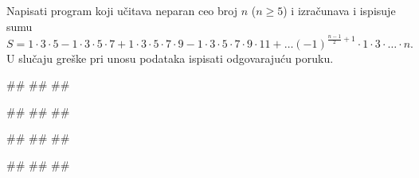 \begin{Exercise}[difficulty=1, label=PET_48] 
Napisati program koji učitava neparan ceo broj $n$ ($n\geq5$) i izračunava
i ispisuje sumu 
$$S = 1\cdot3\cdot5 - 1\cdot3\cdot5\cdot7 + 1\cdot3\cdot5\cdot7\cdot9
- 1\cdot3\cdot5\cdot7\cdot9\cdot11 + \ldots
(-1)^{\frac{n-1}{2}+1}\cdot1\cdot3\cdot \ldots \cdot n.$$ U slučaju
greške pri unosu podataka ispisati odgovarajuću poruku. 
  
\begin{miditest}
\begin{upotreba}{1}
#\naslovInt#
##
##
\end{upotreba}
\end{miditest}
\begin{miditest}
\begin{upotreba}{2}
#\naslovInt#
##
##
\end{upotreba}
\end{miditest}

\begin{miditest}
\begin{upotreba}{3}
#\naslovInt#
##
##
\end{upotreba}
\end{miditest}
\begin{miditest}
\begin{upotreba}{4}
#\naslovInt#
##
##
\end{upotreba}
\end{miditest}
\end{Exercise}
\ifresenja
\begin{Answer}[ref=PET_48]
\end{Answer}
\fi


